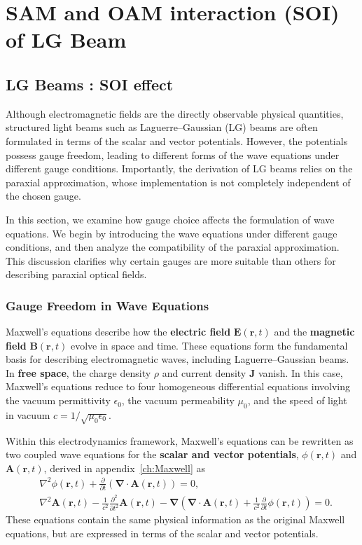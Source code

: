 \chapter{SAM and OAM interaction (SOI) of LG Beam}
\label{ch:Theory}
\section{LG Beams : SOI effect}

Although electromagnetic fields are the directly observable physical quantities, structured light beams such as Laguerre--Gaussian (LG) beams are often formulated in terms of the scalar and vector potentials. However, the potentials possess gauge freedom, leading to different forms of the wave equations under different gauge conditions. Importantly, the derivation of LG beams relies on the paraxial approximation, whose implementation is not completely independent of the chosen gauge.

In this section, we examine how gauge choice affects the formulation of wave equations. We begin by introducing the wave equations under different gauge conditions, and then analyze the compatibility of the paraxial approximation. This discussion clarifies why certain gauges are more suitable than others for describing paraxial optical fields.

\subsection{Gauge Freedom in Wave Equations}

Maxwell's equations describe how the \textbf{electric field} $\boldsymbol{E}(\boldsymbol{r}, t)$ and the \textbf{magnetic field} $\boldsymbol{B}(\boldsymbol{r}, t)$ evolve in space and time. These equations form the fundamental basis for describing electromagnetic waves, including Laguerre--Gaussian beams. In \textbf{free space}, the charge density $\rho$ and current density $\mathbf{J}$ vanish. In this case, Maxwell's equations reduce to four homogeneous differential equations involving the vacuum permittivity $\epsilon_0$, the vacuum permeability $\mu_0$, and the speed of light in vacuum $c=1/\sqrt{\mu_0\epsilon_0}$. 

Within this electrodynamics framework, Maxwell's equations can be rewritten as two coupled wave equations for the \textbf{scalar and vector potentials}, $\phi(\boldsymbol{r}, t)$ and $\boldsymbol{A}(\boldsymbol{r}, t)$, derived in appendix~\ref{ch:Maxwell} as
\begin{align} 
&\nabla^2\phi(\boldsymbol{r}, t)+\frac{\partial }{\partial t}\left(\boldsymbol{\nabla}\cdot\boldsymbol{A}(\boldsymbol{r}, t)\right)=0, \label{max5} \\
&\nabla^2\boldsymbol{A}(\boldsymbol{r}, t)-\frac{1}{c^2}\frac{\partial^2 }{\partial t^2}\boldsymbol{A}(\boldsymbol{r}, t)-\boldsymbol{\nabla}\left(\boldsymbol{\nabla}\cdot\boldsymbol{A}(\boldsymbol{r}, t)+\frac{1}{c^2}\frac{\partial }{\partial t}\phi(\boldsymbol{r}, t)\right)=0. \label{max6}
\end{align}
These equations contain the same physical information as the original Maxwell equations, but are expressed in terms of the scalar and vector potentials.

